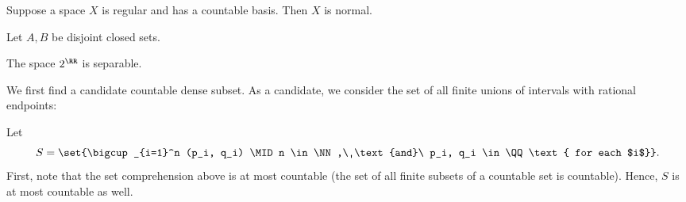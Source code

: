 \documentclass{fkpset}
\begin{document}

  \begin{problem}[5.32]
    Suppose a space $X$ is regular and has a countable basis. Then $X$
    is normal.
  \end{problem}
  \begin{solution}
    Let $A,B$ be disjoint closed sets.
  \end{solution}
  \clearpage

  \begin{problem}[6.6]
    The space $2^\RR$ is separable.
  \end{problem}
  \begin{solution}
    We first find a candidate countable dense subset. As a candidate,
    we consider the set of all finite unions of intervals with
    rational endpoints:
    \begin{leftbar}
      Let
      \[
        S = \set{\bigcup_{i=1}^n (p_i, q_i) \MID n \in \NN,\
          \text{and}\ p_i, q_i \in \QQ \text{ for each $i$}}.
      \]
      First, note that the set comprehension above is at most
      countable (the set of all finite subsets of a countable set is
      countable). Hence, $S$ is at most countable as well.


\end{leftbar}
\end{solution}
\end{document}
